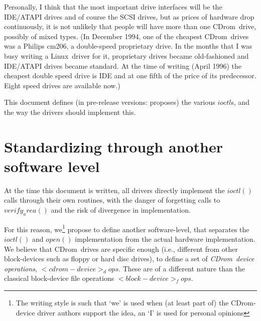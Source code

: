\documentclass{article}
\def\linux{{\sc Linux}}
\def\cdrom{{\sc CDrom}}
\begin{document}
Personally, I think that the most important drive interfaces will be
the IDE/ATAPI drives and of course the SCSI drives, but as prices of
hardware drop continuously, it is not unlikely that people will have
more than one \cdrom\ drive, possibly of mixed types.  (In December
1994, one of the cheapest \cdrom\ drives was a Philips cm206, a
double-speed proprietary drive. In the months that I was busy writing
a \linux\ driver for it, proprietary drives became old-fashioned and
IDE/ATAPI drives became standard. At the time of writing (April 1996)
the cheapest double speed drive is IDE and at one fifth of the price
of its predecessor. Eight speed drives are available now.)

This document defines (in pre-release versions: proposes) the various
$ioctl$s, and the way the drivers should implement this.

\section{Standardizing through another software level}
\label{cdrom.c}

At the time this document is written, all drivers directly implement
the $ioctl()$ calls through their own routines, with the danger of
forgetting calls to $verify_area()$ and the risk of divergence in
implementation. 

For this reason, we\footnote{The writing style is such that `we' is
used when (at least part of) the \cdrom-device driver authors support
the idea, an `I' is used for personal opinions} propose to define
another software-level, that separates the $ioctl()$ and $open()$
implementation from the actual hardware implementation. We believe
that \cdrom\ drives are specific enough (i.e., different from other
block-devices such as floppy or hard disc drives), to define a set of
{\em \cdrom\ device operations}, $<cdrom-device>_dops$. These are of a
different nature than the classical block-device file operations
$<block-device>_fops$.
\end{document}
